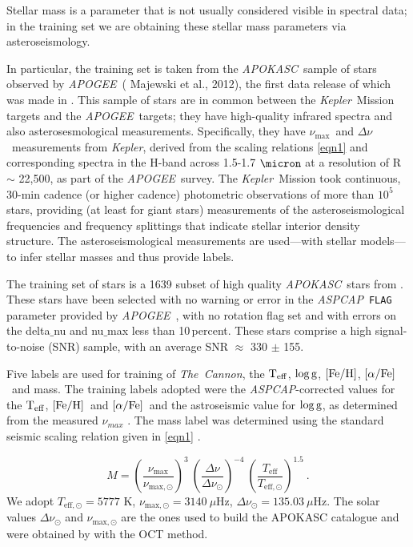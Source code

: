 \documentclass[12pt, preprint]{aastex}
\newcommand{\project}[1]{\textsl{#1}}
\newcommand{\tc}{\project{The~Cannon}}
\newcommand{\apogee}{\project{APOGEE}}
\newcommand{\apokasc}{\project{APOKASC}}
\newcommand{\aspcap}{\project{ASPCAP}}
\newcommand{\kepler}{\project{Kepler}}
\newcommand{\code}[1]{\texttt{#1}}
\newcommand{\teff}{\mbox{$\rm T_{eff}$}}
\newcommand{\feh}{\mbox{$\rm [Fe/H]$}}
\newcommand{\alphafe}{\mbox{$\rm [\alpha/Fe]$}}
\newcommand{\logg}{\mbox{$\rm \log g$}}
\newcommand{\numax}{$\nu_{\max}$}
\newcommand{\deltanu}{$\Delta\nu$}
\begin{document}
Stellar mass is a parameter that is not usually considered visible in
spectral data; in the training set we are obtaining these stellar mass
parameters via asteroseismology.


In particular, the training set is taken from the \apokasc\ sample of
stars observed by \apogee\ ( Majewski et al., 2012), the first data release of which was made in \citet{P2014}. 
This sample of stars are in common between the \kepler\ Mission
targets and the \apogee\ targets; they have high-quality infrared
spectra and also asterosesmological measurements.
Specifically, they have \numax\ and \deltanu\ measurements from \kepler, derived from the scaling relations \ref{eqn1} and corresponding spectra in the H-band across 1.5-1.7 $\micron$ at a resolution of R $\sim$ 22,500, as part of the \apogee\ survey. 
The \kepler\ Mission \citep{B2010} took continuous, 30-min cadence (or
higher cadence) photometric observations of more than $10^5$ stars,
providing (at least for giant stars) measurements of the
asteroseismological frequencies and frequency splittings that indicate
stellar interior density structure.
The asteroseismological measurements are used---with stellar
models---to infer stellar masses and thus provide labels.

The training set of stars is a 1639 subset of high quality \apokasc\ stars from \citet{Martig2015}. These stars have been selected with no warning or error in the \aspcap\ \code{FLAG} parameter provided by \apogee\ \citep{Ahn2014}, with no rotation flag set and with errors on the delta$\_$nu and nu$\_$max less than 10\,percent. These stars comprise a high signal-to-noise (SNR) sample, with an average SNR $\approx$ 330 $\pm$ 155. 

Five labels are used for training of \tc, the \teff, \logg, \feh, \alphafe\ and mass. The training labels adopted were the \aspcap-corrected \citep{Meszaros2013} values for the \teff, \feh\ and \alphafe\ and the astroseismic value for \logg, as determined from the measured $\nu_{max}$ . The mass label was determined using the standard seismic scaling relation given in \ref{eqn1} \citep{SilvaA2011,Chaplin2011}.

\begin{equation} \label{eq:mass}
M= \left( \frac{\nu_{\mathrm{max}}}{\nu_{\mathrm{max,\odot}}}\right)^3\  \left( \frac{\Delta \nu}{\Delta \nu_{\odot}}\right)^{-4} \ \left( \frac{T_{\mathrm{eff}}}{T_{\mathrm{eff,\odot}}}\right)^{1.5} \ .
\end{equation}
We adopt  $T_{\mathrm{eff,\odot}}=5777$ K, $\nu_{\mathrm{max,\odot}}=3140\ \mu$Hz, $\Delta \nu_{\odot}=135.03\ \mu$Hz. The solar values  $\Delta \nu_{\odot}$ and $\nu_{\mathrm{max,\odot}}$ are the ones used to build the APOKASC catalogue and were obtained by \cite{Hekker2013} with the OCT method.
\end{document}
